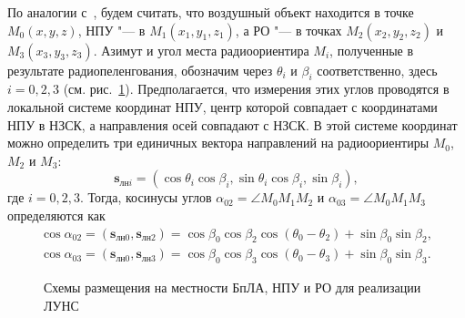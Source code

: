 \documentclass[../main.tex]{subfiles}
\begin{document}
По аналогии с~\cite{antennas}, будем считать, что воздушный объект находится в точке $M_0\left(x, y, z\right)$, НПУ "--- в $M_1\left(x_1, y_1, z_1\right)$, а РО "--- в точках $M_2\left(x_2, y_2, z_2\right)$ и $M_3\left(x_3, y_3, z_3\right)$. Азимут и угол места радиоориентира $M_i$, полученные в результате радиопеленгования, обозначим через $\theta_i$ и $\beta_i$ соответственно, здесь $i = 0, 2, 3$ (см. рис.~\ref{fig:systems:pic1}). Предполагается, что измерения этих углов проводятся в локальной системе координат НПУ, центр которой совпадает с координатами НПУ в НЗСК, а направления осей совпадают с НЗСК. В этой системе координат можно определить три единичных вектора направлений на радиоориентиры $M_0$, $M_2$ и $M_3$:
\begin{equation*}
  \mathbf{s}_{\text{лн}i} = \left(\cos\theta_i \cos\beta_i, \sin\theta_i\cos\beta_i, \sin\beta_i\right),
\end{equation*}
где $i = 0, 2, 3$. Тогда, косинусы углов $\alpha_{02} = \angle M_0 M_1 M_2$ и $\alpha_{03} = \angle M_0 M_1 M_3$ определяются как
\begin{align*}
  \cos\alpha_{02} = \left(\mathbf{s}_{\text{лн}0}, \mathbf{s}_{\text{лн}2}\right) =
  \cos\beta_0 \cos\beta_2 \cos\left(\theta_0 - \theta_2\right) + \sin\beta_0 \sin\beta_2, \\
  \cos\alpha_{03} = \left(\mathbf{s}_{\text{лн}0}, \mathbf{s}_{\text{лн}3}\right) =
  \cos\beta_0 \cos\beta_3 \cos\left(\theta_0 - \theta_3\right) + \sin\beta_0 \sin\beta_3.
\end{align*}

\begin{figure}[htbp]
  \centering


  \caption{Схемы размещения на местности БпЛА, НПУ и РО для реализации ЛУНС}
  \label{fig:systems:pic1}
\end{figure}
\end{document}
